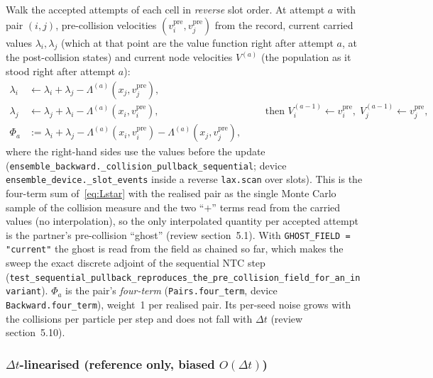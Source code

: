\documentclass[11pt,a4paper]{article}
\numberwithin{equation}{section}
\newcommand{\code}[1]{\texttt{#1}}
\newcommand{\pre}{\mathrm{pre}}
\newcommand{\Lam}{\Lambda}
\begin{document}
Walk the accepted attempts of each cell in \emph{reverse} slot order.  At attempt
$a$ with pair $(i,j)$, pre-collision velocities $(v^{\pre}_i, v^{\pre}_j)$ from the record,
current carried values $\lambda_i, \lambda_j$ (which at that point are the value
function right after attempt $a$, at the post-collision states) and current node
velocities $V^{(a)}$ (the population as it stood right after attempt $a$):
\begin{equation}
\label{eq:sequential}
\begin{aligned}
\lambda_i &\leftarrow \lambda_i + \lambda_j - \Lam^{(a)}(x_j, v^{\pre}_j), \\
\lambda_j &\leftarrow \lambda_j + \lambda_i - \Lam^{(a)}(x_i, v^{\pre}_i), \\
\Phi_a &:= \lambda_i + \lambda_j - \Lam^{(a)}(x_i, v^{\pre}_i) - \Lam^{(a)}(x_j, v^{\pre}_j),
\end{aligned}
\qquad
\text{then } V^{(a-1)}_i \leftarrow v^{\pre}_i,\; V^{(a-1)}_j \leftarrow v^{\pre}_j,
\end{equation}
where the right-hand sides use the values before the update
(\code{ensemble\_backward.\_collision\_pullback\_sequential}; device
\code{ensemble\_device.\_slot\_events} inside a reverse \code{lax.scan} over slots).
This is the four-term sum of~\eqref{eq:Lstar} with the realised pair as the single
Monte Carlo sample of the collision measure and the two ``$+$'' terms read from the
carried values (no interpolation), so the only interpolated quantity per accepted
attempt is the partner's pre-collision ``ghost'' (review section~5.1).  With
\code{GHOST\_FIELD = "current"} the ghost is read from the field as chained so far,
which makes the sweep the exact discrete adjoint of the sequential NTC step
(\code{test\_sequential\_pullback\_reproduces\_the\_pre\_collision\_field\_for\_an\_invariant}).
$\Phi_a$ is the pair's \emph{four-term} (\code{Pairs.four\_term}, device \code{Backward.four\_term}), weight~1 per realised pair.
Its per-seed noise grows with the collisions per particle per step and does not fall
with $\Delta t$ (review section~5.10).

\subsubsection{\texorpdfstring{$\Delta t$-linearised (reference only, biased $O(\Delta t)$)}{dt-linearised (reference only, biased O(dt))}}
\label{sec:linearised}
\end{document}
